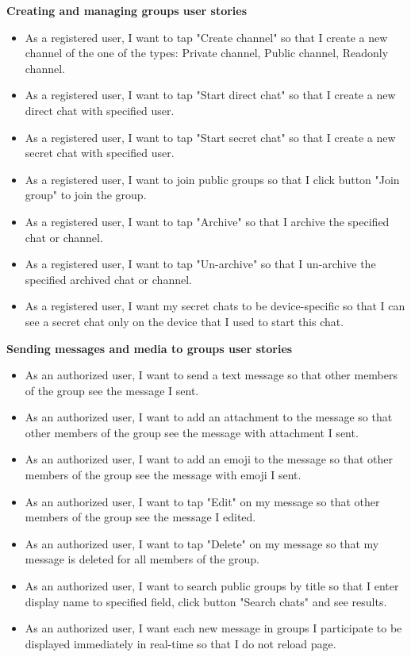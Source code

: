 \textbf{Creating and managing groups user stories}
\begin{itemize}
    \item As a registered user, I want to tap "Create channel" so that I create a new channel of the one of the types:
    Private channel, Public channel, Readonly channel.
    \item As a registered user, I want to tap "Start direct chat" so that I create a new direct chat with specified user.
    \item As a registered user, I want to tap "Start secret chat" so that I create a new secret chat with specified user.
    \item As a registered user, I want to join public groups so that I click button "Join group" to join the group.
    \item As a registered user, I want to tap "Archive" so that I archive the specified chat or channel.
    \item As a registered user, I want to tap "Un-archive" so that I un-archive the specified archived chat or channel.
    \item As a registered user, I want my secret chats to be device-specific so that I can see a secret chat only
    on the device that I used to start this chat.
\end{itemize}

\textbf{Sending messages and media to groups user stories}
\begin{itemize}
    \item As an authorized user, I want to send a text message so that other members of the group see the message I sent.
    \item As an authorized user, I want to add an attachment to the message so that other members of the group see the
    message with attachment I sent.
    \item As an authorized user, I want to add an emoji to the message so that other members of the group see the message with emoji I sent.
    \item As an authorized user, I want to tap "Edit" on my message so that other members of the group see the message I edited.
    \item As an authorized user, I want to tap "Delete" on my message so that my message is deleted for all members of the group.
    \item As an authorized user, I want to search public groups by title so that I enter display name to specified field,
    click button "Search chats" and see results.
    \item As an authorized user, I want each new message in groups I participate to be displayed immediately in
    real-time so that I do not reload page.
\end{itemize}

